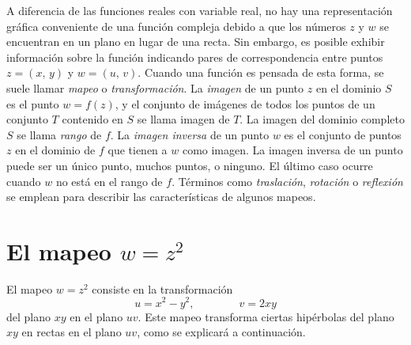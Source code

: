 \documentclass[a4paper]{report}
\begin{document}
A diferencia de las funciones reales con variable real, no hay una representación gráfica conveniente de una función compleja debido a que los números \(z\) y \(w\) se encuentran en un plano en lugar de una recta. Sin embargo, es posible exhibir información sobre la función indicando pares de correspondencia entre puntos \(z=(x,\,y)\) y \(w=(u,\,v)\). Cuando una función es pensada de esta forma, se suele llamar \emph{mapeo} o \emph{transformación}. La \emph{imagen} de un punto \(z\) en el dominio \(S\) es el punto \(w=f(z)\), y el conjunto de imágenes de todos los puntos de un conjunto \(T\) contenido en \(S\) se llama imagen de \(T\). La imagen del dominio completo \(S\) se llama \emph{rango} de \(f\). La \emph{imagen inversa} de un punto \(w\) es el conjunto de puntos \(z\) en el dominio de \(f\) que tienen a \(w\) como imagen. La imagen inversa de un punto puede ser un único punto, muchos puntos, o ninguno. El último caso ocurre cuando \(w\) no está en el rango de \(f\). Términos como \emph{traslación}, \emph{rotación} o \emph{reflexión} se emplean para describir las características de algunos mapeos.

\section{El mapeo \texorpdfstring{\(w=z^2\)}{w=z2}}\label{sec:square_mapping}

El mapeo \(w=z^2\) consiste en la transformación
\begin{equation}\label{eq:square_mapping}
  u=x^2-y^2,\qquad\qquad v=2xy
\end{equation}
del plano \(xy\) en el plano \(uv\). Este mapeo transforma ciertas hipérbolas del plano \(xy\) en rectas en el plano \(uv\), como se explicará a continuación.
\end{document}
